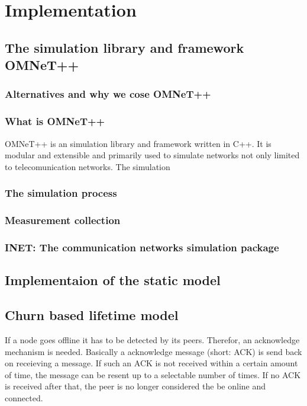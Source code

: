 \chapter{Implementation}

\section{The simulation library and framework OMNeT++}

\subsection{Alternatives and why we cose OMNeT++}

\subsection{What is OMNeT++}

OMNeT++ is an simulation library and framework written in C++. It is modular and extensible and primarily used to simulate networks not only limited to telecomunication networks. The simulation 

\subsection{The simulation process}

\subsection{Measurement collection}

\subsection{INET: The communication networks simulation package}

\section{Implementaion of the static model}



\section{Churn based lifetime model}
If a node goes offline it has to be detected by its peers. Therefor, an acknowledge mechanism is needed. Basically a acknowledge message (short: ACK) is send back on receieving a message. If such an ACK is not received within a certain amount of time, the message can be resent up to a selectable number of times. If no ACK is received after that, the peer is no longer considered the be online and connected.



